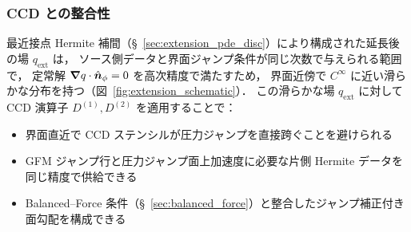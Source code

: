 \subsubsection{CCD との整合性}

最近接点 Hermite 補間（§~\ref{sec:extension_pde_disc}）により構成された延長後の場 $q_{\mathrm{ext}}$ は，
ソース側データと界面ジャンプ条件が同じ次数で与えられる範囲で，
定常解 $\bm{\nabla} q \cdot \hat{\bm n}_{\phi} = 0$ を高次精度で満たすため，
界面近傍で $C^\infty$ に近い滑らかな分布を持つ（図~\ref{fig:extension_schematic}）．
この滑らかな場 $q_{\mathrm{ext}}$ に対して CCD 演算子 $D^{(1)}, D^{(2)}$ を適用することで：
\begin{itemize}
  \item 界面直近で CCD ステンシルが圧力ジャンプを直接跨ぐことを避けられる
  \item GFM ジャンプ行と圧力ジャンプ面上加速度に必要な片側 Hermite データを同じ精度で供給できる
  \item Balanced--Force 条件（§~\ref{sec:balanced_force}）と整合したジャンプ補正付き面勾配を構成できる
\end{itemize}

